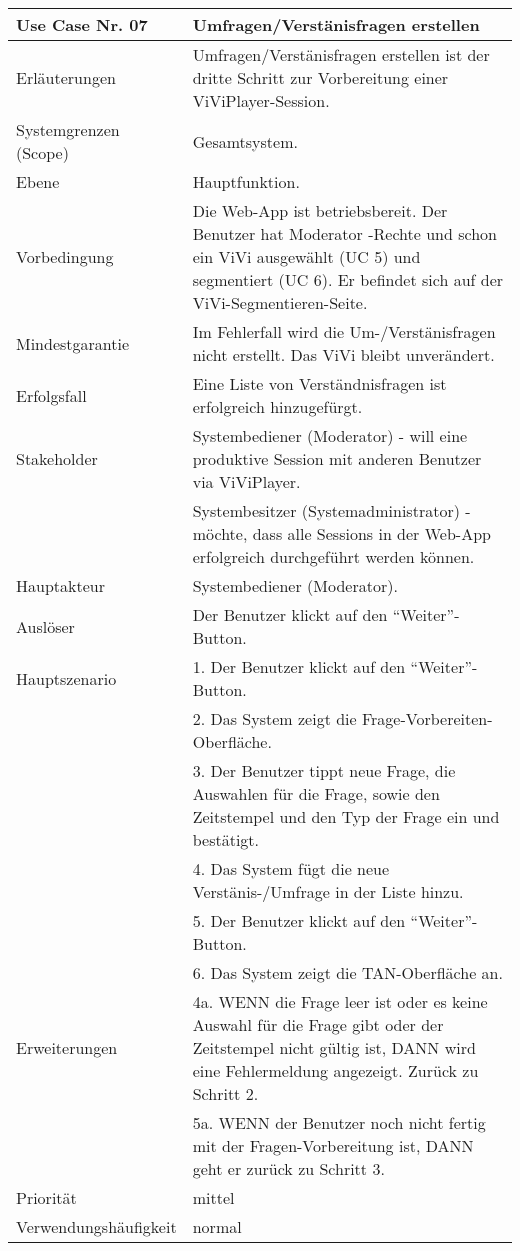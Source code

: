 \begin{tabularx}{\linewidth}{|l|X|}
	\hline
	Use Case Nr. 07			& \textbf{Umfragen/Verstänisfragen erstellen} \\ \hline
	Erläuterungen			& Umfragen/Verstänisfragen erstellen ist der dritte Schritt zur
							  Vorbereitung einer ViViPlayer-Session. \\ \hline
	Systemgrenzen (Scope)	& Gesamtsystem. \\ \hline
	Ebene					& Hauptfunktion. \\ \hline
	Vorbedingung			& Die Web-App ist betriebsbereit. Der Benutzer hat Moderator
							  -Rechte und schon ein ViVi ausgewählt (UC 5) und segmentiert (UC 6). Er befindet sich auf der ViVi-Segmentieren-Seite. \\ \hline
	Mindestgarantie			& Im Fehlerfall wird die Um-/Verstänisfragen nicht erstellt. Das ViVi 
							  bleibt unverändert. \\ \hline
	Erfolgsfall    			& Eine Liste von Verständnisfragen ist erfolgreich hinzugefürgt.
							  \\ \hline
	Stakeholder				& Systembediener (Moderator) - will eine produktive Session mit 
							  anderen Benutzer via ViViPlayer. \\
							& Systembesitzer (Systemadministrator) - möchte, dass alle Sessions 
							  in der Web-App erfolgreich durchgeführt werden können. \\ \hline
	Hauptakteur				& Systembediener (Moderator). \\ \hline
	Auslöser				& Der Benutzer klickt auf den ``Weiter''-Button. \\ \hline	
	Hauptszenario			& 1. Der Benutzer klickt auf den ``Weiter''-Button. \\  
							& 2. Das System zeigt die Frage-Vorbereiten-Oberfläche. \\
							& 3. Der Benutzer tippt neue Frage, die Auswahlen für die 
							  Frage, sowie den Zeitstempel und den Typ der Frage ein und 
							  bestätigt. \\ 
							& 4. Das System fügt die neue Verstänis-/Umfrage in der Liste
							  hinzu. \\ 
							& 5. Der Benutzer klickt auf den ``Weiter''-Button. \\ 
							& 6. Das System zeigt die TAN-Oberfläche an. \\ \hline
	Erweiterungen			& 4a. WENN die Frage leer ist oder es keine Auswahl für die 
							  Frage gibt oder der Zeitstempel nicht gültig ist, DANN wird eine 
							  Fehlermeldung angezeigt. Zurück zu Schritt 2. \\ 
							& 5a. WENN der Benutzer noch nicht fertig mit der 
							  Fragen-Vorbereitung ist, DANN geht er zurück zu Schritt 3. \\ \hline
	Priorität				& mittel \\ \hline
	Verwendungshäufigkeit	& normal \\ \hline
\end{tabularx}